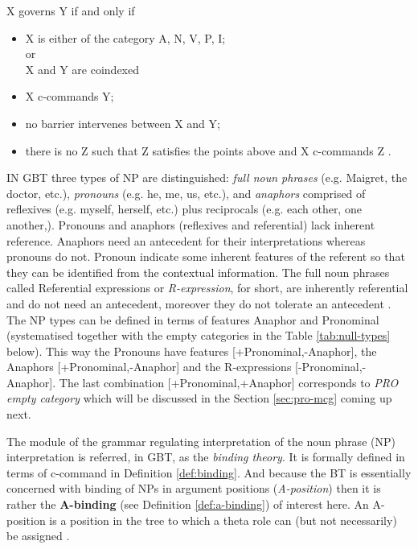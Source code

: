 \begin{definition}[Government]\label{def:government1}
    X governs Y if and only if
    \begin{itemize}
        \item X is either of the category A, N, V, P, I; \\
            or \\
            X and Y are coindexed
        \item X c-commands Y;
        \item no barrier intervenes between X and Y;
        \item there is no Z such that Z satisfies the points above and X c-commands Z \citep[557]{Haegeman1991}.
    \end{itemize}
\end{definition}

IN GBT three types of NP are distinguished: \textit{full noun phrases} (e.g. Maigret, the doctor,  etc.), \textit{pronouns} (e.g. he, me, us, etc.), and \textit{anaphors} comprised of reflexives (e.g. myself, herself, etc.) plus reciprocals (e.g. each other, one another,). 
Pronouns and anaphors (reflexives and referential) lack inherent reference. Anaphors need an antecedent for their interpretations whereas pronouns do not. Pronoun indicate some inherent features of the referent so that they can be identified from the contextual information. The full noun phrases called Referential expressions or \textit{R-expression}, for short, are inherently referential and do not need an antecedent, moreover they do not tolerate an antecedent \citep[226]{Haegeman1991}. The NP types can be defined in terms of features Anaphor and Pronominal (systematised together with the empty categories in the Table \ref{tab:null-types} below). This way the Pronouns have features [+Pronominal,-Anaphor], the Anaphors [+Pronominal,-Anaphor] and the R-expressions [-Pronominal,-Anaphor]. The last combination [+Pronominal,+Anaphor] corresponds to \textit{PRO empty category} which will be discussed in the Section \ref{sec:pro-mcg} coming up next. 

The module of the grammar regulating interpretation of the noun phrase (NP) interpretation is referred, in GBT, as the \textit{binding theory}. It is formally defined in terms of c-command in Definition \ref{def:binding}. And because the BT is essentially concerned with binding of NPs in argument positions (\textit{A-position}) then it is rather the \textbf{A-binding} (see Definition \ref{def:a-binding}) of interest here. An A-position is a position in the tree to which a theta role can (but not necessarily) be assigned \citep[115]{Haegeman1991}.

